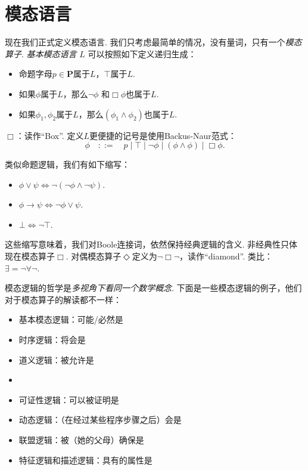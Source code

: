 \section{模态语言}
现在我们正式定义模态语言. 我们只考虑最简单的情况，没有量词，只有一个\emph{模态算子}. \emph{基本模态语言} $L$ 可以按照如下定义递归生成：
\begin{itemize}
    \item 命题字母$p\in \mathbf P$属于$L$，$\top$属于$L$.
    \item 如果$\phi$属于$L$，那么$\neg\phi$ 和$\Box\phi$也属于$L$.
    \item 如果$\phi_1,\phi_2$属于$L$，那么$(\phi_1\wedge\phi_2)$也属于$L$.
\end{itemize}
$\Box$：读作“Box”. 定义$L$更便捷的记号是使用Backus-Naur范式：
    \[\phi\quad::=\quad p\mid \top\mid \neg\phi\mid (\phi\wedge\phi)\mid \Box\phi.\] 

类似命题逻辑，我们有如下缩写：
\begin{itemize}
    \item $\phi\vee\psi\iff\neg(\neg \phi\wedge\neg\psi)$.
    \item $\phi\to\psi\iff\neg\phi\vee\psi$.
    \item $\bot\iff\neg\top$.
\end{itemize}
这些缩写意味着，我们对Boole连接词，依然保持经典逻辑的含义. 非经典性只体现在模态算子$\Box$. 对偶模态算子$\Diamond$定义为$\neg\Box\neg$，读作“diamond”. 类比：$\exists=\neg\forall\neg$.

模态逻辑的哲学是\emph{多视角下看同一个数学概念}. 下面是一些模态逻辑的例子，他们对于模态算子的解读都不一样：

\begin{itemize}
    \item {}基本模态逻辑：可能/必然是
    \item {}时序逻辑：将会是
    \item {}道义逻辑：被允许是
    \item {}
    \item {}可证性逻辑：可以被证明是
    \item {}动态逻辑：（在经过某些程序步骤之后）会是
    \item {}联盟逻辑：被（她的父母）确保是
    \item {}特征逻辑和描述逻辑：具有的属性是
\end{itemize}

